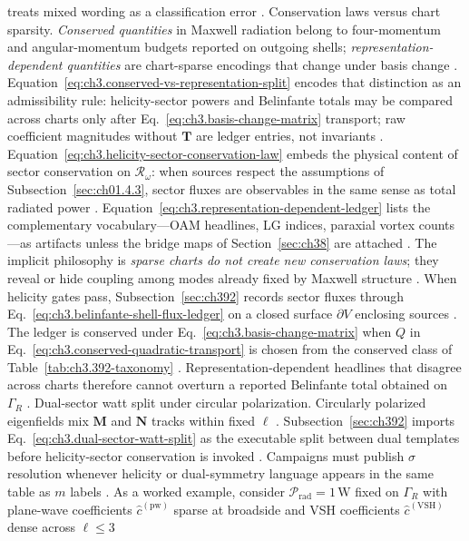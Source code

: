 treats mixed wording as a classification error \cite{harrington2001}.
Conservation laws versus chart sparsity. \emph{Conserved quantities} in Maxwell radiation belong to four-momentum and angular-momentum budgets reported on
outgoing shells; \emph{representation-dependent quantities} are chart-sparse encodings that change under basis change
\cite{belinfante1940}. Equation~\eqref{eq:ch3.conserved-vs-representation-split} encodes that
distinction as an admissibility rule: helicity-sector powers and Belinfante totals may be compared across charts only
after Eq.~\eqref{eq:ch3.basis-change-matrix} transport; raw coefficient magnitudes without \(\mathbf{T}\) are ledger
entries, not invariants \cite{belinfante1940}. Equation~\eqref{eq:ch3.helicity-sector-conservation-law}
embeds the physical content of sector conservation on \(\mathcal{R}_\omega\): when sources respect the assumptions of
Subsection~\ref{sec:ch01.4.3}, sector fluxes are observables in the same sense as total radiated power
\cite{belinfante1940}. Equation~\eqref{eq:ch3.representation-dependent-ledger} lists the complementary
vocabulary---OAM headlines, LG indices, paraxial vortex counts---as artifacts unless the bridge maps of
Section~\ref{sec:ch38} are attached \cite{allen1992}. The implicit philosophy is
\emph{sparse charts do not create new conservation laws}; they reveal or hide coupling among modes already fixed by
Maxwell structure \cite{stratton1941}.
When helicity gates pass, Subsection~\ref{sec:ch392} records sector fluxes through Eq.~\eqref{eq:ch3.belinfante-shell-flux-ledger} on a closed surface \(\partial V\) enclosing sources
\cite{belinfante1940}. The ledger is conserved under Eq.~\eqref{eq:ch3.basis-change-matrix} when \(Q\) in Eq.~\eqref{eq:ch3.conserved-quadratic-transport} is chosen from the conserved class of Table~\ref{tab:ch3.392-taxonomy}
\cite{hansen1988}. Representation-dependent headlines that disagree across charts therefore cannot overturn a reported Belinfante total obtained on \(\Gamma_R\)
\cite{belinfante1940}.
Dual-sector watt split under circular polarization. Circularly polarized eigenfields mix \(\mathbf{M}\) and \(\mathbf{N}\) tracks within fixed \(\ell\) \cite{belinfante1940}. Subsection~\ref{sec:ch392} imports Eq.~\eqref{eq:ch3.dual-sector-watt-split} as the executable split between dual templates before helicity-sector conservation is invoked
\cite{harrington2001}. Campaigns must publish \(\sigma\) resolution whenever helicity or dual-symmetry language appears in the same table as \(m\) labels
\cite{belinfante1940}.
As a worked example, consider \(\mathcal{P}_{\mathrm{rad}}=1\,\mathrm{W}\) fixed on \(\Gamma_R\) with plane-wave coefficients \(\widehat{c}^{(\mathrm{pw})}\) sparse at broadside and VSH coefficients \(\widehat{c}^{(\mathrm{VSH})}\) dense across \(\ell\le3\)
